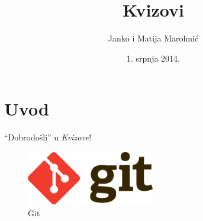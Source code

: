 \documentclass{scrreprt}
\begin{document}
\titlehead{
  Sveučilište u Zagrebu\\
  Filozofski fakultet\\
  Odsijek za informacijske i komunikacijske znanosti\\
  Akademska godina 2013/14.
}
\subject{Web development}
\title{Kvizovi}
\author{Janko i Matija Marohnić}
\date{1. srpnja 2014.}

\maketitle
\tableofcontents

\chapter{Uvod}

``Dobrodošli'' u \emph{Kvizove}!

\begin{figure}[b]
  \centering
  \includegraphics[width=0.5\textwidth]{Git-Logo-2Color}
  \caption{Git}
\end{figure}
\end{document}

